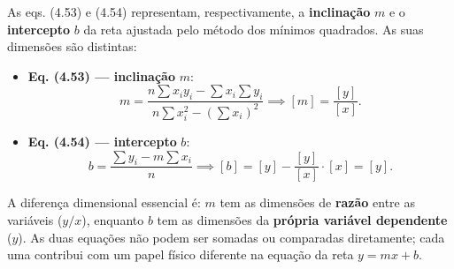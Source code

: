 As eqs. (4.53) e (4.54) representam, respectivamente, a \textbf{inclinação} $m$ e o \textbf{intercepto} $b$ da reta ajustada pelo método dos mínimos quadrados. As suas dimensões são distintas:

\begin{itemize}
\item \textbf{Eq. (4.53) --- inclinação} $m$:
\[
m = \frac{n\sum x_i y_i - \sum x_i\sum y_i}{n\sum x_i^{2}-(\sum x_i)^{2}} \implies [m] = \frac{[y]}{[x]}.
\]
\item \textbf{Eq. (4.54) --- intercepto} $b$:
\[
b = \frac{\sum y_i - m\sum x_i}{n} \implies [b] = [y] - \frac{[y]}{[x]}\cdot[x] = [y].
\]
\end{itemize}

A diferença dimensional essencial é: $m$ tem as dimensões de \textbf{razão} entre as variáveis ($y/x$), enquanto $b$ tem as dimensões da \textbf{própria variável dependente} ($y$). As duas equações não podem ser somadas ou comparadas diretamente; cada uma contribui com um papel físico diferente na equação da reta $y = mx + b$. 